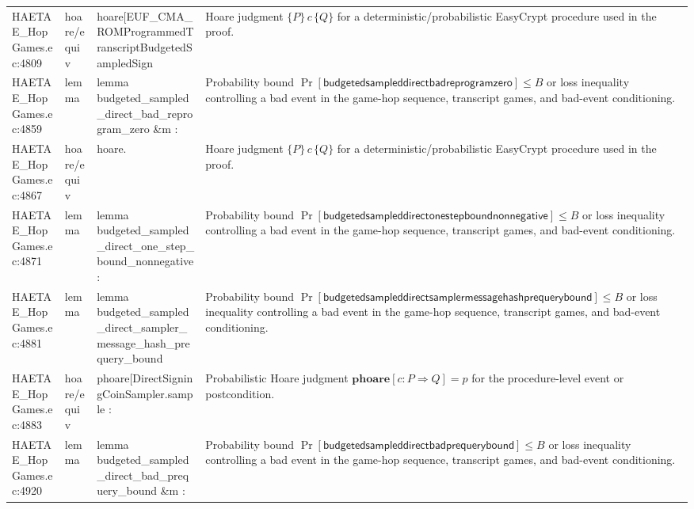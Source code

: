 \documentclass[10pt]{article}
\begin{document}
\begin{longtable}{L{0.11\textwidth}L{0.055\textwidth}L{0.385\textwidth}L{0.41\textwidth}}
HAETAE\_\allowbreak{}HopGames.\allowbreak{}ec:\allowbreak{}4809 & hoare/equiv & {\ttfamily\scriptsize hoare[EUF\_\allowbreak{}CMA\_\allowbreak{}ROMProgrammedTranscriptBudgetedSampledSign} & Hoare judgment $\{P\}\,c\,\{Q\}$ for a deterministic/probabilistic EasyCrypt procedure used in the proof. \\
HAETAE\_\allowbreak{}HopGames.\allowbreak{}ec:\allowbreak{}4859 & lemma & {\ttfamily\scriptsize lemma budgeted\_\allowbreak{}sampled\_\allowbreak{}direct\_\allowbreak{}bad\_\allowbreak{}reprogram\_\allowbreak{}zero \&m :} & Probability bound $\Pr[\mathsf{budgetedsampleddirectbadreprogramzero}]\le B$ or loss inequality controlling a bad event in the game-hop sequence, transcript games, and bad-event conditioning. \\
HAETAE\_\allowbreak{}HopGames.\allowbreak{}ec:\allowbreak{}4867 & hoare/equiv & {\ttfamily\scriptsize hoare.} & Hoare judgment $\{P\}\,c\,\{Q\}$ for a deterministic/probabilistic EasyCrypt procedure used in the proof. \\
HAETAE\_\allowbreak{}HopGames.\allowbreak{}ec:\allowbreak{}4871 & lemma & {\ttfamily\scriptsize lemma budgeted\_\allowbreak{}sampled\_\allowbreak{}direct\_\allowbreak{}one\_\allowbreak{}step\_\allowbreak{}bound\_\allowbreak{}nonnegative :} & Probability bound $\Pr[\mathsf{budgetedsampleddirectonestepboundnonnegative}]\le B$ or loss inequality controlling a bad event in the game-hop sequence, transcript games, and bad-event conditioning. \\
HAETAE\_\allowbreak{}HopGames.\allowbreak{}ec:\allowbreak{}4881 & lemma & {\ttfamily\scriptsize lemma budgeted\_\allowbreak{}sampled\_\allowbreak{}direct\_\allowbreak{}sampler\_\allowbreak{}message\_\allowbreak{}hash\_\allowbreak{}prequery\_\allowbreak{}bound} & Probability bound $\Pr[\mathsf{budgetedsampleddirectsamplermessagehashprequerybound}]\le B$ or loss inequality controlling a bad event in the game-hop sequence, transcript games, and bad-event conditioning. \\
HAETAE\_\allowbreak{}HopGames.\allowbreak{}ec:\allowbreak{}4883 & hoare/equiv & {\ttfamily\scriptsize phoare[DirectSigningCoinSampler.sample :} & Probabilistic Hoare judgment $\mathbf{phoare}[c:P\Rightarrow Q]=p$ for the procedure-level event or postcondition. \\
HAETAE\_\allowbreak{}HopGames.\allowbreak{}ec:\allowbreak{}4920 & lemma & {\ttfamily\scriptsize lemma budgeted\_\allowbreak{}sampled\_\allowbreak{}direct\_\allowbreak{}bad\_\allowbreak{}prequery\_\allowbreak{}bound \&m :} & Probability bound $\Pr[\mathsf{budgetedsampleddirectbadprequerybound}]\le B$ or loss inequality controlling a bad event in the game-hop sequence, transcript games, and bad-event conditioning. \\

\end{longtable}
\end{document}

